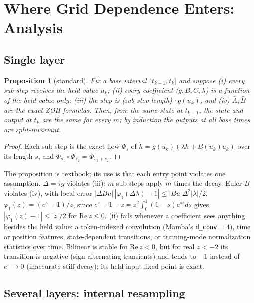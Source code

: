 \documentclass{article}
\theoremstyle{plain}
\newtheorem{proposition}[theorem]{Proposition}
\theoremstyle{definition}
\theoremstyle{remark}
\begin{document}
\section{Where Grid Dependence Enters: Analysis}
\label{sec:analysis}

\subsection{Single layer}
\label{sec:single}

\begin{proposition}[standard]
\label{prop:split}
Fix a base interval $(t_{k-1},t_k]$ and suppose
(i) every sub-step receives the held value $u_k$;
(ii) every coefficient ($g,B,C,\lambda$) is a function of the held value only;
(iii) the step is (sub-step length)$\,\cdot g(u_k)$; and
(iv) $\bar A,\bar B$ are the exact ZOH formulas.
Then, from the same state at $t_{k-1}$, the state and output at $t_k$ are the same for every $m$; by induction the outputs at all base times are split-invariant.
\end{proposition}
\begin{proof}
Each sub-step is the exact flow $\Phi_s$ of $\dot h=g(u_k)(\lambda h+B(u_k)u_k)$ over its length $s$, and $\Phi_{s_1}\circ\Phi_{s_2}=\Phi_{s_1+s_2}$.
\end{proof}

The proposition is textbook; its use is that each entry point violates one assumption.
$\Delta{=}\tau g$ violates (iii): $m$ sub-steps apply $m$ times the decay.
Euler-$B$ violates (iv), with local error $|\Delta Bu|\,|\varphi_1(\Delta\lambda)-1|\le|Bu|\Delta^2|\lambda|/2$, $\varphi_1(z)=(e^z-1)/z$, since $e^z-1-z=z^2\int_0^1(1-s)e^{sz}ds$ gives $|\varphi_1(z)-1|\le|z|/2$ for $\mathrm{Re}\,z\le0$.
(ii) fails whenever a coefficient sees anything besides the held value: a token-indexed convolution (Mamba's \texttt{d\_conv}${=}4$), time or position features, state-dependent transitions, or training-mode normalization statistics over time.
Bilinear is stable for $\mathrm{Re}\,z<0$, but for real $z<-2$ its transition is negative (sign-alternating transients) and tends to $-1$ instead of $e^z\to0$ (inaccurate stiff decay); its held-input fixed point is exact.

\subsection{Several layers: internal resampling}
\label{sec:coupling}
\end{document}
